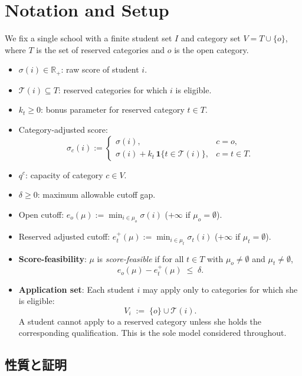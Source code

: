 \documentclass[
  12pt,
  a4paper,
  oneside,
  onecolumn,
  titlepage,
  final
]{jsarticle}
\newcommand{\T}{\mathcal{T}}
\newcommand{\1}{\mathbf{1}}
\begin{document}
\section{Notation and Setup}
 
We fix a single school with a finite student set $I$ and category set
$V = T \cup \{o\}$, where $T$ is the set of reserved categories and $o$ is
the open category.
 
\begin{itemize}
  \item $\sigma(i)\in\mathbb{R}_+$: raw score of student $i$.
  \item $\T(i)\subseteq T$: reserved categories for which $i$ is eligible.
  \item $k_t\ge 0$: bonus parameter for reserved category $t\in T$.
  \item Category-adjusted score:
        \[
          \sigma_c(i) :=
          \begin{cases}
            \sigma(i), & c = o,\\[4pt]
            \sigma(i) + k_t\,\mathbf{1}\{t\in\T(i)\}, & c = t\in T.
          \end{cases}
        \]
  \item $q^c$: capacity of category $c\in V$.
  \item $\delta\ge 0$: maximum allowable cutoff gap.
  \item Open cutoff: $e_o(\mu) := \min_{i\in\mu_o}\sigma(i)$
        ($+\infty$ if $\mu_o=\emptyset$).
  \item Reserved adjusted cutoff:
        $e_t^+(\mu) := \min_{i\in\mu_t}\sigma_t(i)$
        ($+\infty$ if $\mu_t=\emptyset$).
  \item \textbf{Score-feasibility}: $\mu$ is \emph{score-feasible} if for
        all $t\in T$ with $\mu_o\ne\emptyset$ and $\mu_t\ne\emptyset$,
        \[
          e_o(\mu) - e_t^+(\mu) \;\le\; \delta.
        \]
  \item \textbf{Application set}:
        Each student $i$ may apply only to categories for which she is
        eligible:
        \[
          V_i \;:=\; \{o\} \cup \T(i).
        \]
        A student cannot apply to a reserved category unless she holds the
        corresponding qualification.  This is the sole model considered
        throughout.
\end{itemize}
 
 
\subsection{性質と証明}
\end{document}
